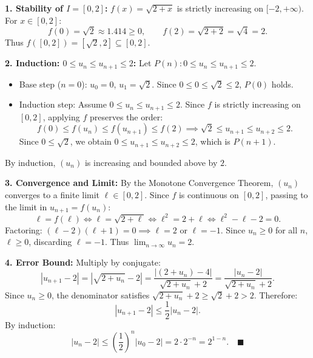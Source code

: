 \begin{solution}
\textbf{1. Stability of $I = [0, 2]$:}
$f(x) = \sqrt{2 + x}$ is strictly increasing on $[-2, +\infty)$.
For $x \in [0, 2]$:
\[
f(0) = \sqrt{2} \approx 1.414 \ge 0, \qquad f(2) = \sqrt{2 + 2} = \sqrt{4} = 2.
\]
Thus $f([0, 2]) = [\sqrt{2}, 2] \subseteq [0, 2]$.

\textbf{2. Induction: $0 \le u_n \le u_{n+1} \le 2$:}
Let $P(n): 0 \le u_n \le u_{n+1} \le 2$.
\begin{itemize}[leftmargin=1.5em,itemsep=2pt]
  \item Base step ($n = 0$): $u_0 = 0$, $u_1 = \sqrt{2}$. Since $0 \le 0 \le \sqrt{2} \le 2$, $P(0)$ holds.
  \item Induction step: Assume $0 \le u_n \le u_{n+1} \le 2$.
  Since $f$ is strictly increasing on $[0, 2]$, applying $f$ preserves the order:
  \[
  f(0) \le f(u_n) \le f(u_{n+1}) \le f(2) \implies \sqrt{2} \le u_{n+1} \le u_{n+2} \le 2.
  \]
  Since $0 \le \sqrt{2}$, we obtain $0 \le u_{n+1} \le u_{n+2} \le 2$, which is $P(n+1)$.
\end{itemize}
By induction, $(u_n)$ is increasing and bounded above by $2$.

\textbf{3. Convergence and Limit:}
By the Monotone Convergence Theorem, $(u_n)$ converges to a finite limit $\ell \in [0, 2]$.
Since $f$ is continuous on $[0, 2]$, passing to the limit in $u_{n+1} = f(u_n)$:
\[
\ell = f(\ell) \iff \ell = \sqrt{2 + \ell} \iff \ell^2 = 2 + \ell \iff \ell^2 - \ell - 2 = 0.
\]
Factoring: $(\ell - 2)(\ell + 1) = 0 \implies \ell = 2$ or $\ell = -1$.
Since $u_n \ge 0$ for all $n$, $\ell \ge 0$, discarding $\ell = -1$.
Thus $\lim_{n \to \infty} u_n = 2$.

\textbf{4. Error Bound:}
Multiply by conjugate:
\[
|u_{n+1} - 2| = |\sqrt{2 + u_n} - 2| = \frac{|(2 + u_n) - 4|}{\sqrt{2 + u_n} + 2} = \frac{|u_n - 2|}{\sqrt{2 + u_n} + 2}.
\]
Since $u_n \ge 0$, the denominator satisfies $\sqrt{2 + u_n} + 2 \ge \sqrt{2} + 2 > 2$.
Therefore:
\[
|u_{n+1} - 2| \le \frac{1}{2}|u_n - 2|.
\]
By induction:
\[
|u_n - 2| \le \left(\frac{1}{2}\right)^n |u_0 - 2| = 2 \cdot 2^{-n} = 2^{1 - n}. \quad \blacksquare
\]
\end{solution}


